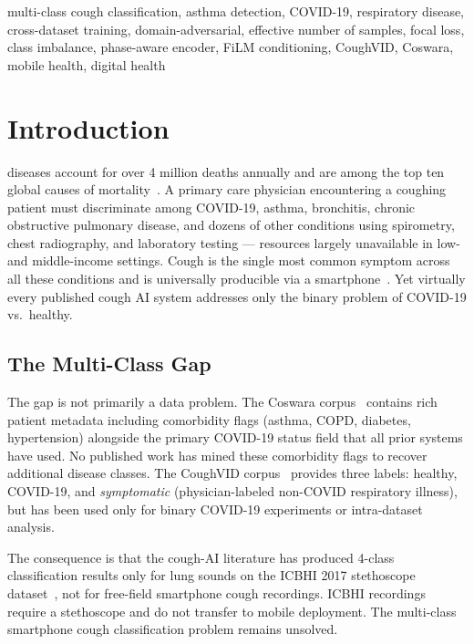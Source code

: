 \documentclass[journal]{IEEEtran}
\begin{document}
\begin{IEEEkeywords}
multi-class cough classification, asthma detection, COVID-19,
respiratory disease, cross-dataset training, domain-adversarial,
effective number of samples, focal loss, class imbalance,
phase-aware encoder, FiLM conditioning, CoughVID, Coswara,
mobile health, digital health
\end{IEEEkeywords}

\section{Introduction}
\label{sec:intro}

 diseases account for over 4 million
deaths annually and are among the top ten global causes of
mortality~\cite{who2023}. A primary care physician encountering
a coughing patient must discriminate among COVID-19, asthma, bronchitis,
chronic obstructive pulmonary disease, and dozens of other conditions
using spirometry, chest radiography, and laboratory testing — resources
largely unavailable in low- and middle-income settings. Cough is the
single most common symptom across all these conditions and is
universally producible via a smartphone~\cite{cough_survey2024}. Yet
virtually every published cough AI system addresses only the binary
problem of COVID-19 vs.\ healthy.

\subsection{The Multi-Class Gap}

The gap is not primarily a data problem. The Coswara corpus~\cite{coswara}
contains rich patient metadata including comorbidity flags (asthma,
COPD, diabetes, hypertension) alongside the primary COVID-19 status
field that all prior systems have used. No published work has mined
these comorbidity flags to recover additional disease classes. The
CoughVID corpus~\cite{coughvid} provides three labels: healthy,
COVID-19, and \emph{symptomatic} (physician-labeled non-COVID
respiratory illness), but has been used only for binary COVID-19
experiments or intra-dataset analysis.

The consequence is that the cough-AI literature has produced 4-class
classification results only for lung sounds on the ICBHI 2017
stethoscope dataset~\cite{icbhi2017}, not for free-field smartphone
cough recordings. ICBHI recordings require a stethoscope and do not
transfer to mobile deployment. The multi-class smartphone cough
classification problem remains unsolved.
\end{document}
